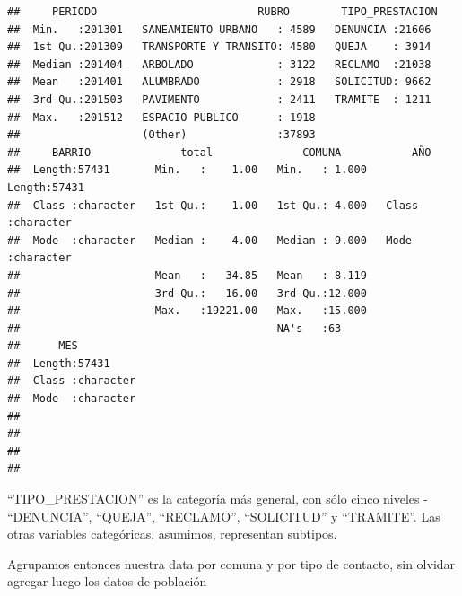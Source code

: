 \documentclass[spanish,]{book}
\newenvironment{Shaded}{\begin{snugshade}}{\end{snugshade}}
\newcommand{\DataTypeTok}[1]{\textcolor[rgb]{0.13,0.29,0.53}{#1}}
\newcommand{\DecValTok}[1]{\textcolor[rgb]{0.00,0.00,0.81}{#1}}
\newcommand{\KeywordTok}[1]{\textcolor[rgb]{0.13,0.29,0.53}{\textbf{#1}}}
\newcommand{\NormalTok}[1]{#1}
\newcommand{\OperatorTok}[1]{\textcolor[rgb]{0.81,0.36,0.00}{\textbf{#1}}}
\newcommand{\StringTok}[1]{\textcolor[rgb]{0.31,0.60,0.02}{#1}}
\begin{document}
\begin{verbatim}
##     PERIODO                         RUBRO        TIPO_PRESTACION 
##  Min.   :201301   SANEAMIENTO URBANO   : 4589   DENUNCIA :21606  
##  1st Qu.:201309   TRANSPORTE Y TRANSITO: 4580   QUEJA    : 3914  
##  Median :201404   ARBOLADO             : 3122   RECLAMO  :21038  
##  Mean   :201401   ALUMBRADO            : 2918   SOLICITUD: 9662  
##  3rd Qu.:201503   PAVIMENTO            : 2411   TRAMITE  : 1211  
##  Max.   :201512   ESPACIO PUBLICO      : 1918                    
##                   (Other)              :37893                    
##     BARRIO              total              COMUNA           AÑO           
##  Length:57431       Min.   :    1.00   Min.   : 1.000   Length:57431      
##  Class :character   1st Qu.:    1.00   1st Qu.: 4.000   Class :character  
##  Mode  :character   Median :    4.00   Median : 9.000   Mode  :character  
##                     Mean   :   34.85   Mean   : 8.119                     
##                     3rd Qu.:   16.00   3rd Qu.:12.000                     
##                     Max.   :19221.00   Max.   :15.000                     
##                                        NA's   :63                         
##      MES           
##  Length:57431      
##  Class :character  
##  Mode  :character  
##                    
##                    
##                    
## 
\end{verbatim}

``TIPO\_PRESTACION'' es la categoría más general, con sólo cinco niveles - ``DENUNCIA'', ``QUEJA'', ``RECLAMO'', ``SOLICITUD'' y ``TRAMITE''. Las otras variables categóricas, asumimos, representan subtipos.

Agrupamos entonces nuestra data por comuna y por tipo de contacto, sin olvidar agregar luego los datos de población

\begin{Shaded}
\end{Shaded}
\end{document}
